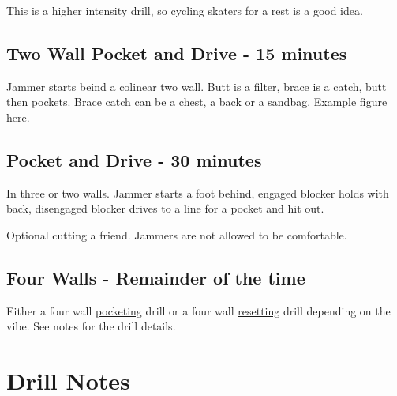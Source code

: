 \documentclass{journal}
\begin{document}
This is a higher intensity drill, so cycling skaters for a rest is a good idea.



\subsection*{Two Wall Pocket and Drive - 15 minutes }
Jammer starts beind a colinear two wall. 
Butt is a filter, brace is a catch, butt then pockets. 
Brace catch can be a chest, a back or a sandbag.
\hyperref[drill:two_wall/double_lines]{Example figure here}.



\subsection*{Pocket and Drive - 30 minutes}
In three or two walls.
Jammer starts a foot behind, engaged blocker holds with back, disengaged blocker drives to a line for a pocket and hit out.


Optional cutting a friend.
Jammers are not allowed to be comfortable.


\subsection*{Four Walls - Remainder of the time}

Either a four wall \hyperref[drill:four_wall/pocket]{pocketing} drill or a four wall \hyperref[drill:four_wall/reset]{resetting} drill depending on the vibe.
See notes for the drill details.


\pagebreak


\section*{Drill Notes}











\end{document}
